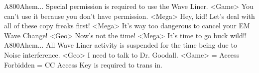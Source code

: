 {A8}{00}Ahem... 
Special permission is required to use the Wave Liner. 
<Game> You can't use it because you don't have permission. 
<Mega> Hey, kid! Let's deal with all of these copy freaks first! 
<Mega> It's way too dangerous to cancel your EM Wave Change! 
<Geo> Now's not the time! 
<Mega> It's time to go buck wild!! 
{A8}{00}Ahem... 
All Wave Liner activity is suspended for the time being due to Noise interference. 
<Geo> I need to talk to Dr. Goodall. 
<Game> = Access Forbidden = CC Access Key is required to trans in. 
